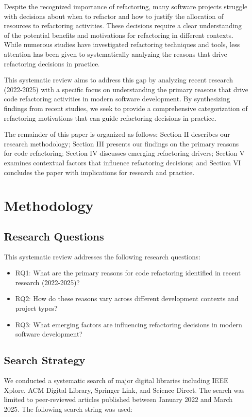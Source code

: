 \documentclass[journal,onecolumn]{IEEEtran}
\begin{document}
Despite the recognized importance of refactoring, many software projects struggle with decisions about when to refactor and how to justify the allocation of resources to refactoring activities. These decisions require a clear understanding of the potential benefits and motivations for refactoring in different contexts. While numerous studies have investigated refactoring techniques and tools, less attention has been given to systematically analyzing the reasons that drive refactoring decisions in practice.

This systematic review aims to address this gap by analyzing recent research (2022-2025) with a specific focus on understanding the primary reasons that drive code refactoring activities in modern software development. By synthesizing findings from recent studies, we seek to provide a comprehensive categorization of refactoring motivations that can guide refactoring decisions in practice.

The remainder of this paper is organized as follows: Section II describes our research methodology; Section III presents our findings on the primary reasons for code refactoring; Section IV discusses emerging refactoring drivers; Section V examines contextual factors that influence refactoring decisions; and Section VI concludes the paper with implications for research and practice.

\section{Methodology}
\subsection{Research Questions}
This systematic review addresses the following research questions:
\begin{itemize}
    \item RQ1: What are the primary reasons for code refactoring identified in recent research (2022-2025)?
    \item RQ2: How do these reasons vary across different development contexts and project types?
    \item RQ3: What emerging factors are influencing refactoring decisions in modern software development?
\end{itemize}

\subsection{Search Strategy}
We conducted a systematic search of major digital libraries including IEEE Xplore, ACM Digital Library, Springer Link, and Science Direct. The search was limited to peer-reviewed articles published between January 2022 and March 2025. The following search string was used:
\end{document}
